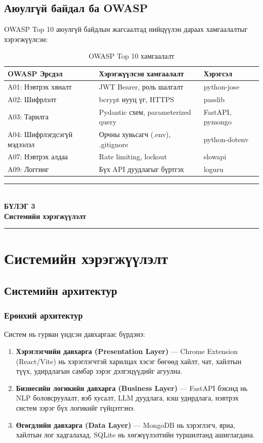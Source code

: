 \documentclass[12pt,a4paper]{report}
\newcommand{\chappage}[2]{%
  \clearpage
  \thispagestyle{empty}
  \null\vfill
  \begin{center}
    \rule{0.60\textwidth}{0.8pt}\\[18pt]
    {\fontsize{22}{28}\selectfont\bfseries БҮЛЭГ #1}\\[12pt]
    {\Large\bfseries #2}\\[18pt]
    \rule{0.60\textwidth}{0.8pt}
  \end{center}
  \vfill\null
  \clearpage}
\begin{document}
\section{Аюулгүй байдал ба OWASP}

OWASP Top 10 \cite{owasp2021} аюулгүй байдлын жагсаалтад нийцүүлэн дараах хамгаалалтыг хэрэгжүүлсэн:

\begin{table}[H]
\centering
\caption{OWASP Top 10 хамгаалалт}
\label{tab:owasp}
\begin{tabularx}{\textwidth}{@{}lXX@{}}
\toprule
\textbf{OWASP Эрсдэл} & \textbf{Хэрэгжүүлсэн хамгаалалт} & \textbf{Хэрэгсэл} \\
\midrule
A01: Нэвтрэх хяналт & JWT Bearer, роль шалгалт & python-jose \\
A02: Шифрлэлт & bcrypt нууц үг, HTTPS & passlib \\
A03: Тарилга & Pydantic схем, parameterized query & FastAPI, pymongo \\
A04: Шифрлэгдсэгүй мэдээлэл & Орчны хувьсагч (.env), .gitignore & python-dotenv \\
A07: Нэвтрэх алдаа & Rate limiting, lockout & slowapi \\
A09: Логгинг & Бүх API дуудлагыг бүртгэх & loguru \\
\bottomrule
\end{tabularx}
\end{table}

\chappage{3}{Системийн хэрэгжүүлэлт}

\chapter{Системийн хэрэгжүүлэлт}

\section{Системийн архитектур}

\subsection{Ерөнхий архитектур}

Систем нь гурван үндсэн давхаргаас бүрдэнэ:

\begin{enumerate}[leftmargin=1.5cm]
  \item \textbf{Хэрэглэгчийн давхарга (Presentation Layer)} --- Chrome Extension (React/Vite) нь хэрэглэгчтэй харилцах хэсэг бөгөөд хайлт, чат, хайлтын түүх, удирдлагын самбар зэрэг дэлгэцүүдийг агуулна.
  \item \textbf{Бизнесийн логикийн давхарга (Business Layer)} --- FastAPI бэкэнд нь NLP боловсруулалт, вэб хусалт, LLM дуудлага, кэш удирдлага, нэвтрэх систем зэрэг бүх логикийг гүйцэтгэнэ.
  \item \textbf{Өгөгдлийн давхарга (Data Layer)} --- MongoDB нь хэрэглэгч, яриа, хайлтын лог хадгалахад, SQLite нь хөгжүүлэлтийн туршилтанд ашиглагдана.
\end{enumerate}
\end{document}
